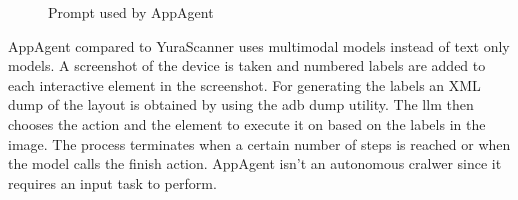 \begin{figure}
\centering
{}
\caption{Prompt used by AppAgent}
\end{figure}

AppAgent compared to YuraScanner uses multimodal models instead of text
only models. A screenshot of the device is taken and numbered labels are
added to each interactive element in the screenshot. For generating the
labels an XML dump of the layout is obtained by using the adb dump
utility. The llm then chooses the action and the element to execute it
on based on the labels in the image. The process terminates when a
certain number of steps is reached or when the model calls the finish
action. AppAgent isn't an autonomous cralwer since it requires an input
task to perform.
